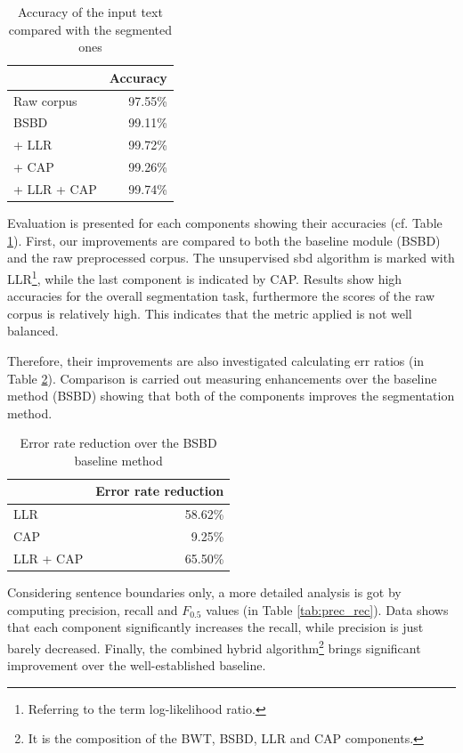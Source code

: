 \begin{table}[H]
\centering
\caption{Accuracy of the input text compared with the segmented ones}
\label{tab:base}
\begin{tabular}{ l  r } 
\hline
& Accuracy \\ 
\hline
Raw corpus  & 97.55\% \\
BSBD & 99.11\% \\
\hspace{0.2cm}+ LLR & 99.72\% \\
\hspace{0.2cm}+ CAP & 99.26\% \\
\hspace{0.2cm}+ LLR + CAP & 99.74\% \\
\hline
\end{tabular}
\end{table}

Evaluation is presented for each components showing their accuracies (cf. Table \ref{tab:base}).
First, our improvements are compared to both the baseline module (BSBD) and the raw preprocessed corpus.
The unsupervised \acrshort{sbd} algorithm is marked with LLR\footnote{Referring to the term log-likelihood ratio.}, while the last component is indicated by CAP.
Results show high accuracies for the overall segmentation task, furthermore the scores of the raw corpus is relatively high.
This indicates that the metric applied is not well balanced.

Therefore, their improvements are also investigated calculating \acrlong{err} ratios (in Table \ref{tab:reduction}). 
Comparison is carried out measuring enhancements over the baseline method (BSBD) showing that both of the components improves the segmentation method.

\begin{table}[H]
\centering
\caption{Error rate reduction over the BSBD baseline method}
\label{tab:reduction}
\begin{tabular}{ l  r } 
\hline
& Error rate reduction\\
\hline
LLR & 58.62\% \\
CAP & 9.25\% \\
LLR + CAP & 65.50\% \\
\hline
\end{tabular}
\end{table}

Considering sentence boundaries only, a more detailed analysis is got by computing precision, recall and $F_{0.5}$ values (in Table \ref{tab:prec_rec}). 
Data shows that each component significantly increases the recall, while precision is just barely decreased. 
Finally, the combined hybrid algorithm\footnote{It is the composition of the BWT, BSBD, LLR and CAP components.} brings significant improvement over the well-established baseline.

